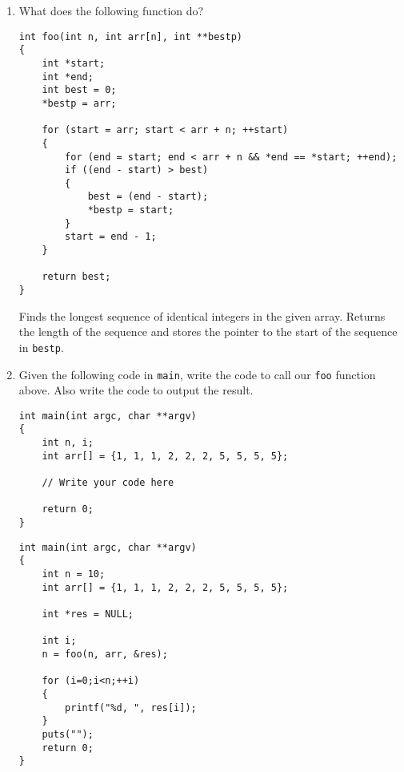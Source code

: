 %
%


\begin{enumerate}
\item What does the following function do?

\begin{lstlisting}
int foo(int n, int arr[n], int **bestp)
{
	int *start;
	int *end;
	int best = 0;
	*bestp = arr;
	
	for (start = arr; start < arr + n; ++start)
	{
		for (end = start; end < arr + n && *end == *start; ++end);
		if ((end - start) > best)
		{
			best = (end - start);
			*bestp = start;
		}
		start = end - 1;
	}
	
	return best;
}
\end{lstlisting}

\begin{answer}
Finds the longest sequence of identical integers in the given array.
Returns the length of the sequence and stores the pointer to the start of the sequence in \texttt{bestp}.
\end{answer}

\item Given the following code in \texttt{main}, write the code to call our \texttt{foo} function above.
Also write the code to output the result.
\begin{lstlisting}[numbers=none]
int main(int argc, char **argv)
{
	int n, i;
	int arr[] = {1, 1, 1, 2, 2, 2, 5, 5, 5, 5};

	// Write your code here

	return 0;
}
\end{lstlisting}

\begin{answer}
\begin{lstlisting}
int main(int argc, char **argv)
{
	int n = 10;
	int arr[] = {1, 1, 1, 2, 2, 2, 5, 5, 5, 5};

	int *res = NULL;

	int i;
	n = foo(n, arr, &res);

	for (i=0;i<n;++i)
	{
		printf("%d, ", res[i]);
	}
	puts("");
	return 0;
}
\end{lstlisting}
\end{answer}
\end{enumerate}
